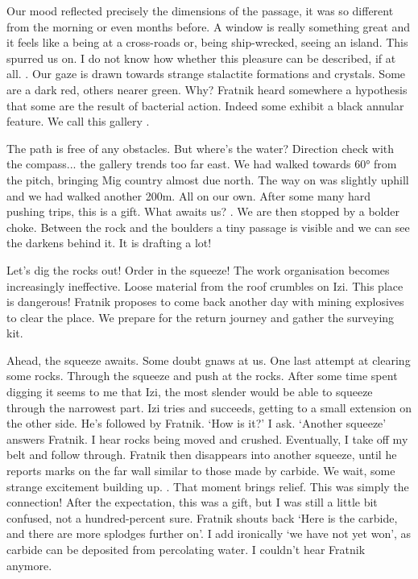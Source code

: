 Our mood reflected precisely the dimensions of the passage, it was so different from the morning or even months before. A window is really something great and it feels like a being at a cross-roads or, being ship-wrecked, seeing an island. This spurred us on. I do not know how whether this pleasure can be described, if at all. . Our gaze is drawn towards strange stalactite formations and crystals. Some are a dark red, others nearer green. Why? Fratnik heard somewhere a hypothesis that some are the result of bacterial action. Indeed some exhibit a black annular feature. We call this gallery . 

The path is free of any obstacles. But where's the water? Direction check with the compass... the gallery trends too far east. We had walked towards 60° from the pitch, bringing Mig country almost due north. The way on was slightly uphill and we had walked another 200m. All on our own. After some many hard pushing trips, this is a gift. What awaits us? . We are then stopped by a bolder choke. Between the rock and the boulders a tiny passage is visible and we can see the darkens behind it. It is drafting a lot! 

 Let's dig the rocks out! Order in the squeeze! The work organisation becomes increasingly ineffective. Loose material from the roof crumbles on Izi. This place is dangerous! Fratnik proposes to come back another day with mining explosives to clear the place. We prepare for the return journey and gather the surveying kit. 

Ahead, the squeeze awaits. Some doubt gnaws at us. One last attempt at clearing some rocks. Through the squeeze and push at the rocks. After some time spent digging it seems to me that Izi, the most slender would be able to squeeze through the narrowest part. Izi tries and succeeds, getting to a small extension on the other side. He's followed by Fratnik. `How is it?' I ask. `Another squeeze' answers Fratnik. I hear rocks being moved and crushed. Eventually, I take off my belt and follow through. Fratnik then disappears into another squeeze, until he reports marks on the far wall similar to those made by carbide. We wait, some strange excitement building up. . That moment brings relief. This was simply the connection! After the expectation, this was a gift, but I was still a little bit confused, not a hundred-percent sure. Fratnik shouts back `Here is the carbide, and there are more splodges further on'. I add ironically `we have not yet won', as carbide can be deposited from percolating water. I couldn't hear Fratnik anymore.

